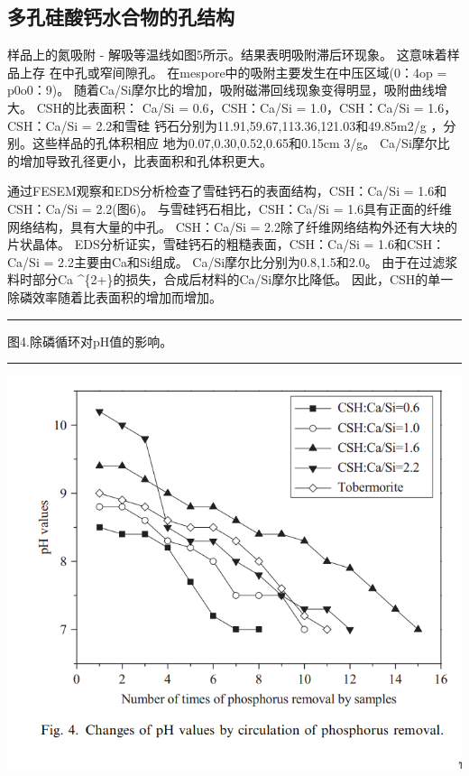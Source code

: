 \documentclass[11pt]{article}
\begin{document}
\subsection{多孔硅酸钙水合物的孔结构}
\label{sec:org1d5806a}
样品上的氮吸附 - 解吸等温线如图5所示。结果表明吸附滞后环现象。 这意味着样品上存
在中孔或窄间隙孔\cite{Poreestructure_and_surface_fractal_characteristics_of_calcium_silicate_hydrates_contained_organic_macromolecule}。 在mespore中的吸附主要发生在中压区域(0：4op = p0o0：9)。
随着Ca/Si摩尔比的增加，吸附磁滞回线现象变得明显，吸附曲线增大。 CSH的比表面积：
Ca/Si = 0.6，CSH：Ca/Si = 1.0，CSH：Ca/Si = 1.6，CSH：Ca/Si = 2.2和雪硅
钙石分别为11.91,59.67,113.36,121.03和49.85m2/g ，分别。这些样品的孔体积相应
地为0.07,0.30,0.52,0.65和0.15cm 3/g。 Ca/Si摩尔比的增加导致孔径更小，比表面积和孔体积更大。

通过FESEM观察和EDS分析检查了雪硅钙石的表面结构，CSH：Ca/Si = 1.6和CSH：Ca/Si = 2.2(图6)。 与雪硅钙石相比，CSH：Ca/Si = 1.6具有正面的纤维网络结构，具有大量的中孔。 CSH：Ca/Si = 2.2除了纤维网络结构外还有大块的片状晶体。 EDS分析证实，雪硅钙石的粗糙表面，CSH：Ca/Si = 1.6和CSH：Ca/Si = 2.2主要由Ca和Si组成。 Ca/Si摩尔比分别为0.8,1.5和2.0。 由于在过滤浆料时部分Ca \^{}\{2+\}的损失，合成后材料的Ca/Si摩尔比降低。 因此，CSH的单一除磷效率随着比表面积的增加而增加。

\noindent\rule{\textwidth}{0.5pt}

图4.除磷循环对pH值的影响。

\noindent\rule{\textwidth}{0.5pt}
\includegraphics[scale=0.5]{fig.4.png}
\end{document}
